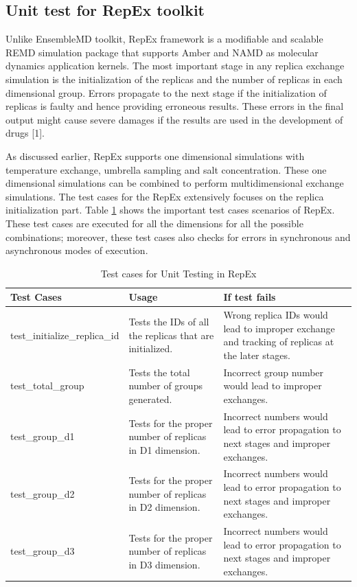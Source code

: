 \documentclass[10pt]{ruthesis}
\begin{document}
\subsection{Unit test for RepEx toolkit}
Unlike EnsembleMD toolkit, RepEx framework is a modifiable and scalable REMD simulation package that supports Amber and NAMD as molecular dynamics application kernels. The most important stage in any replica exchange simulation is the initialization of the replicas and the number of replicas in each dimensional group. Errors propagate to the next stage if the initialization of replicas is faulty and hence providing erroneous results. These errors in the final output might cause severe damages if the results are used in the development of drugs [1].

As discussed earlier, RepEx supports one dimensional simulations with temperature exchange, umbrella sampling and salt concentration. These one dimensional simulations can be combined to perform multidimensional exchange simulations. The test cases for the RepEx extensively focuses on the replica initialization part. Table \ref{repexapitable} shows the important test cases scenarios of RepEx. These test cases are executed for all the dimensions for all the possible combinations; moreover, these test cases also checks for errors in synchronous and asynchronous modes of execution.

\begin{table}
\begin{center}
\def\arraystretch{2}
\begin{tabular}{|p{4cm}|p{5cm}|p{6cm}|}
\hline
\rule{0pt}{15pt} \textbf{Test Cases} & \textbf{Usage} & \textbf{If test fails} \\[2ex]
\hline
test\_initialize\_replica\_id &
Tests the IDs of all the replicas that are initialized. &
Wrong replica IDs would lead to improper exchange and tracking of replicas at the later stages.
\\
\hline
test\_total\_group &
Tests the total number of groups generated. &
Incorrect group number would lead to improper exchanges.
\\
\hline
test\_group\_d1 &
Tests for the proper number of replicas in D1 dimension. &
Incorrect numbers would lead to error propagation to next stages and improper exchanges.
\\
\hline
test\_group\_d2 &
Tests for the proper number of replicas in D2 dimension. &
Incorrect numbers would lead to error propagation to next stages and improper exchanges.
\\
test\_group\_d3 &
Tests for the proper number of replicas in D3 dimension. &
Incorrect numbers would lead to error propagation to next stages and improper exchanges.
\\
\hline
\end{tabular}
\end{center}
\caption{Test cases for Unit Testing in RepEx}
\label{repexapitable}
\end{table}
\end{document}
